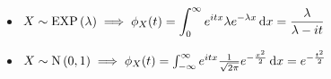 \begin{ejem}
	\begin{itemize} %
		\item $\ds X\sim\EXP{\lambda} \implies \phi_X(t) = \int_{0}^{\infty} e^{itx}\lambda e^{-\lambda x}\odif{x} = \frac{\lambda}{\lambda - it}$
		\item $X\sim\normal{0,1} \implies \phi_X(t) = \int_{-\infty}^{\infty} e^{itx}\frac{1}{\sqrt{2\pi}}e^{-\frac{x^2}{2}}\odif{x} = e^{-\frac{t^2}{2}}$
	\end{itemize}
\end{ejem}
